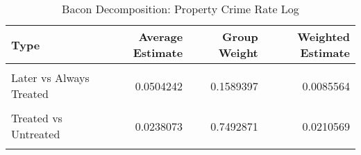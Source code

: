 \begin{table}[H]

\caption{\label{tab:tab:bacondecompositionProperty}Bacon Decomposition: Property Crime Rate Log}
\centering
\begin{tabular}[t]{lrrr}
\toprule
Type & Average Estimate & Group Weight & Weighted Estimate\\
\midrule
\cellcolor{gray!6}{Earlier vs Later Treated} & \cellcolor{gray!6}{0.0036098} & \cellcolor{gray!6}{0.0683810} & \cellcolor{gray!6}{-0.0007191}\\
Later vs Always Treated & 0.0504242 & 0.1589397 & 0.0085564\\
\cellcolor{gray!6}{Later vs Earlier Treated} & \cellcolor{gray!6}{0.0490119} & \cellcolor{gray!6}{0.0233921} & \cellcolor{gray!6}{0.0001507}\\
Treated vs Untreated & 0.0238073 & 0.7492871 & 0.0210569\\
\cellcolor{gray!6}{Total TWFE} & \cellcolor{gray!6}{NaN} & \cellcolor{gray!6}{NaN} & \cellcolor{gray!6}{0.0290449}\\
\bottomrule
\end{tabular}
\end{table}
